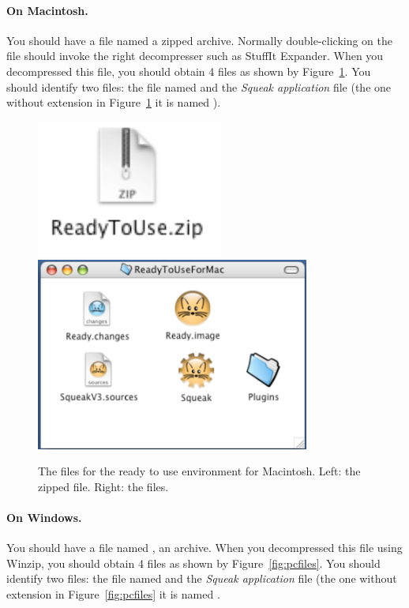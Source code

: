 \paragraph{On Macintosh.}
You should have a file named   a zipped archive. Normally double-clicking on the file should invoke the right decompresser such as StuffIt Expander. When you decompressed this file, you should obtain 4 files as shown by Figure~\ref{fig:macfiles}. You should identify two files: the file named  and the \emph{Squeak application} file (the one without extension in Figure~\ref{fig:macfiles} it is named ).

\begin{figure}[h]\centerline{\includegraphics{readyToUseMacZip2}\includegraphics[width=9cm]{macFiles2}}
\caption{The files for the ready to use environment for Macintosh. Left: the zipped file. Right: the files.\label{fig:macfiles}}\end{figure}


\newpage


\paragraph{On Windows.}
You should have a file named , an archive.  When you decompressed this file using Winzip, you should obtain 4 files as shown by Figure~\ref{fig:pcfiles}. You should identify two files: the file named  and the \emph{Squeak application} file (the one without extension in Figure~\ref{fig:pcfiles} it is named .


